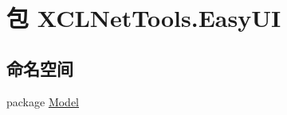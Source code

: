 \hypertarget{namespace_x_c_l_net_tools_1_1_easy_u_i}{\section{包 X\-C\-L\-Net\-Tools.\-Easy\-U\-I}
\label{namespace_x_c_l_net_tools_1_1_easy_u_i}
}
\subsection*{命名空间}
\begin{DoxyCompactItemize}
\item 
package \hyperlink{namespace_x_c_l_net_tools_1_1_easy_u_i_1_1_model}{Model}
\end{DoxyCompactItemize}
